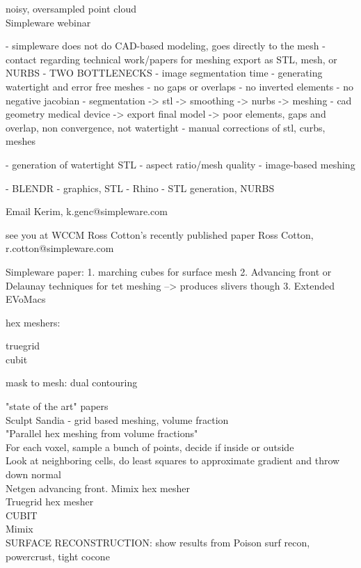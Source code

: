 noisy, oversampled point cloud\\


Simpleware webinar

- simpleware does not do CAD-based modeling, goes directly to the mesh
- contact regarding technical work/papers for meshing
export as STL, mesh, or NURBS
- TWO BOTTLENECKS
  - image segmentation time
  - generating watertight and error free meshes
    - no gaps or overlaps 
    - no inverted elements 
    - no negative jacobian
- segmentation -> stl -> smoothing -> nurbs -> meshing -  cad geometry medical device -> export final model -> poor elements, gaps and overlap, non convergence, not watertight
- manual corrections of stl, curbs, meshes

- generation of watertight STL
- aspect ratio/mesh quality
- image-based meshing

- BLENDR - graphics, STL
- Rhino - STL generation, NURBS

Email Kerim, k.genc@simpleware.com

see you at WCCM
Ross Cotton’s recently published paper
Ross Cotton, r.cotton@simpleware.com

Simpleware paper:
1. marching cubes for surface mesh
2. Advancing front or Delaunay techniques for tet meshing --> produces slivers though
3. Extended EVoMacs

hex meshers:

truegrid\\
cubit

mask to mesh:
dual contouring

"state of the art" papers\\
Sculpt Sandia - grid based meshing, volume fraction \\
"Parallel hex meshing from volume fractions"\\
For each voxel, sample a bunch of points, decide if inside or outside \\
Look at neighboring cells, do least squares to approximate gradient and throw down normal \\

Netgen advancing front. Mimix hex mesher \\

Truegrid hex mesher \\
CUBIT \\
Mimix \\


SURFACE RECONSTRUCTION:
show results from Poison surf recon, powercrust, tight cocone \\

